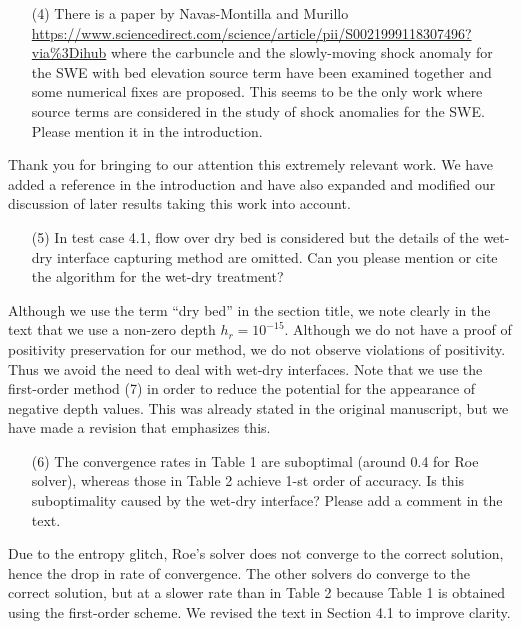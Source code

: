 \documentclass[english,11pt]{article}
\begin{document}
\bigskip
{\color{OliveGreen}
  \begin{itemize}
  \item[(4)]
    There is a paper by Navas-Montilla and Murillo 
    \url{https://www.sciencedirect.com/science/article/pii/S0021999118307496?via\%3Dihub}
    where the carbuncle and the slowly-moving shock anomaly for the SWE with bed elevation source term 
    have been examined together and some numerical fixes are proposed. This seems to be the only work 
    where source terms are considered in the study of shock anomalies for the SWE. 
    Please mention it in the introduction.
  \end{itemize}
}
\noindent
Thank you for bringing to our attention this extremely relevant work.  We have added a reference in
the introduction and have also expanded and modified our discussion of later results taking
this work into account.

\bigskip
{\color{OliveGreen}
  \begin{itemize}
  \item[(5)]
    In test case 4.1, flow over dry bed is considered but the details of the wet-dry interface 
    capturing method are omitted. Can you please mention or cite the algorithm for the wet-dry treatment?
  \end{itemize}
}
\noindent
Although we use the term ``dry bed'' in the section title, we note clearly in the text that we
use a non-zero depth $h_r=10^{-15}$.  Although we do not have a proof of positivity preservation
for our method, we do not observe violations of positivity.  Thus we avoid the
need to deal with wet-dry interfaces.  Note that we use the first-order method
(7) in order to reduce the potential for the appearance of negative depth
values.  This was already stated in the original manuscript, but we have made a revision
that emphasizes this.


\bigskip
{\color{OliveGreen}
  \begin{itemize}
  \item[(6)]
    The convergence rates in Table 1 are suboptimal (around 0.4 for Roe solver), 
    whereas those in Table 2 achieve 1-st order of accuracy. Is this suboptimality caused by 
    the wet-dry interface? Please add a comment in the text.
  \end{itemize}
}
\noindent
Due to the entropy glitch, Roe's solver does not converge to the correct solution,
hence the drop in rate of convergence.
The other solvers do converge to the correct solution, but at a slower rate than
in Table 2 because Table 1 is obtained using the first-order scheme. 
We revised the text in Section 4.1 to improve clarity. 
\end{document}
